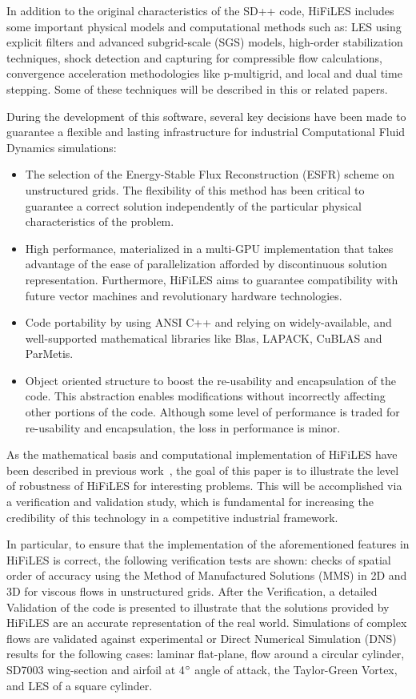 In addition to the original characteristics of the SD++ code, HiFiLES includes some important physical models and computational methods such as: LES using explicit filters and advanced subgrid-scale (SGS) models, high-order stabilization techniques, shock detection and capturing for compressible flow calculations, convergence acceleration methodologies like p-multigrid, and local and dual time stepping. Some of these techniques will be described in this or related papers.

During the development of this software, several key decisions have been made to guarantee a flexible and lasting infrastructure for industrial Computational Fluid Dynamics simulations:
\begin{itemize}
\item The selection of the Energy-Stable Flux Reconstruction (ESFR) scheme on unstructured grids. The flexibility of this method has been critical to guarantee a correct solution independently of the particular physical characteristics of the problem.
\item High performance, materialized in a multi-GPU implementation that takes advantage of the ease of parallelization afforded by discontinuous solution representation. Furthermore, HiFiLES aims to guarantee compatibility with future vector machines and revolutionary hardware technologies.
\item Code portability by using ANSI C++ and relying on widely-available, and well-supported mathematical libraries like Blas, LAPACK, CuBLAS and ParMetis.
\item Object oriented structure to boost the re-usability and encapsulation of the code. This abstraction enables modifications without incorrectly affecting other portions of the code. Although some level of performance is traded for re-usability and encapsulation, the loss in performance is minor.
\end{itemize}

As the mathematical basis and computational implementation of HiFiLES have been described in previous work~\cite{castonguay2011}, the goal of this paper is to illustrate the level of robustness of HiFiLES for interesting problems. This will be accomplished via a verification and validation study, which is fundamental for increasing the credibility of this technology in a competitive industrial framework.

In particular, to ensure that the implementation of the aforementioned features in HiFiLES is correct, the following verification tests are shown: checks of spatial order of accuracy using the Method of Manufactured Solutions (MMS) in 2D and 3D for viscous  flows in unstructured grids. After the Verification, a detailed Validation of the code is presented to illustrate that the solutions provided by HiFiLES are an accurate representation of the real world. Simulations of complex flows are validated against experimental or Direct Numerical Simulation (DNS) results for the following cases: laminar flat-plane, flow around a circular cylinder, SD7003 wing-section and airfoil at 4$^{\circ}$ angle of attack, the Taylor-Green Vortex, and LES of a square cylinder.

